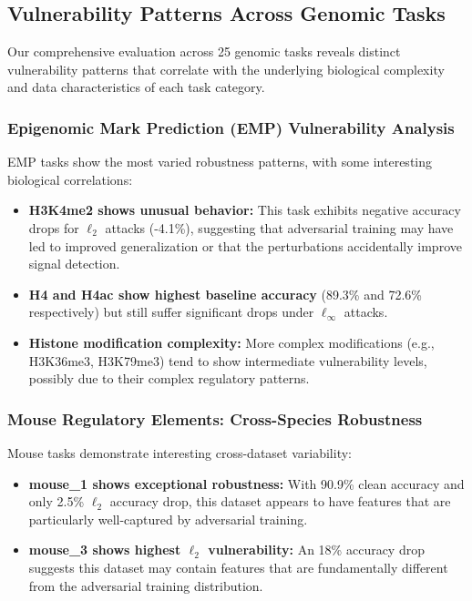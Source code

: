 \documentclass{article} %
\begin{document}
\subsection{Vulnerability Patterns Across Genomic Tasks}

Our comprehensive evaluation across 25 genomic tasks reveals distinct vulnerability patterns that correlate with the underlying biological complexity and data characteristics of each task category.

\subsubsection{Epigenomic Mark Prediction (EMP) Vulnerability Analysis}

EMP tasks show the most varied robustness patterns, with some interesting biological correlations:
\begin{itemize}
    \item \textbf{H3K4me2 shows unusual behavior:} This task exhibits negative accuracy drops for $\ell_2$ attacks (-4.1\%), suggesting that adversarial training may have led to improved generalization or that the perturbations accidentally improve signal detection.
    \item \textbf{H4 and H4ac show highest baseline accuracy} (89.3\% and 72.6\% respectively) but still suffer significant drops under $\ell_\infty$ attacks.
    \item \textbf{Histone modification complexity:} More complex modifications (e.g., H3K36me3, H3K79me3) tend to show intermediate vulnerability levels, possibly due to their complex regulatory patterns.
\end{itemize}

\subsubsection{Mouse Regulatory Elements: Cross-Species Robustness}

Mouse tasks demonstrate interesting cross-dataset variability:
\begin{itemize}
    \item \textbf{mouse\_1 shows exceptional robustness:} With 90.9\% clean accuracy and only 2.5\% $\ell_2$ accuracy drop, this dataset appears to have features that are particularly well-captured by adversarial training.
    \item \textbf{mouse\_3 shows highest $\ell_2$ vulnerability:} An 18\% accuracy drop suggests this dataset may contain features that are fundamentally different from the adversarial training distribution.
\end{itemize}
\end{document}
